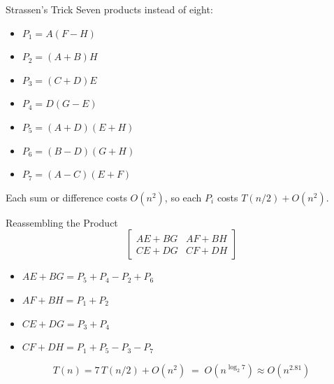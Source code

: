 \documentclass[10pt,aspectratio=169]{beamer}
\begin{document}
\begin{frame}{Strassen's Trick}
  Seven products instead of eight:

  \bigskip
  \begin{center}
  \begin{minipage}{0.42\textwidth}
    \begin{itemize}
      \item $P_1 = A(F-H)$
      \item $P_2 = (A+B)H$
      \item $P_3 = (C+D)E$
      \item $P_4 = D(G-E)$
    \end{itemize}
  \end{minipage}\hfill
  \begin{minipage}{0.5\textwidth}
    \begin{itemize}
      \item $P_5 = (A+D)(E+H)$
      \item $P_6 = (B-D)(G+H)$
      \item $P_7 = (A-C)(E+F)$
    \end{itemize}
  \end{minipage}
  \end{center}

  \bigskip
  Each sum or difference costs $O(n^2)$, so each $P_i$ costs $T(n/2) + O(n^2)$.
\end{frame}

\begin{frame}{Reassembling the Product}
  \[
    \begin{bmatrix} AE + BG & AF + BH \\ CE + DG & CF + DH \end{bmatrix}
  \]

  \bigskip
  \begin{itemize}
    \item $AE + BG = P_5 + P_4 - P_2 + P_6$
    \item $AF + BH = P_1 + P_2$
    \item $CE + DG = P_3 + P_4$
    \item $CF + DH = P_1 + P_5 - P_3 - P_7$
  \end{itemize}

  \bigskip
  \begin{alertblock}{}
    \[
      T(n) = 7\,T(n/2) + O(n^2)
      \;=\; O(n^{\log_2 7}) \approx O(n^{2.81})
    \]
  \end{alertblock}
\end{frame}
\end{document}
